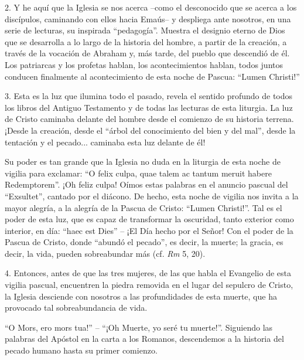 			\begin{body}2. Y he aquí que la Iglesia se nos acerca –como el desconocido que se acerca a los discípulos, caminando con ellos hacia Emaús– y despliega ante nosotros, en una serie de lecturas, su inspirada “pedagogía”. Muestra el designio eterno de Dios que se desarrolla a lo largo de la historia del hombre, a partir de la creación, a través de la vocación de Abraham y, más tarde, del pueblo que descendió de él. Los patriarcas y los profetas hablan, los acontecimientos hablan, todos juntos conducen finalmente al acontecimiento de esta noche de Pascua: “Lumen Christi!” \end{body}
			
			\begin{body}3. Esta es la luz que ilumina todo el pasado, revela el sentido profundo de todos los libros del Antiguo Testamento y de todas las lecturas de esta liturgia. La luz de Cristo caminaba delante del hombre desde el comienzo de su historia terrena. ¡Desde la creación, desde el “árbol del conocimiento del bien y del mal”, desde la tentación y el pecado... caminaba esta luz delante de él! \end{body}
			
			\begin{body}Su poder es tan grande que la Iglesia no duda en la liturgia de esta noche de vigilia para exclamar: “O felix culpa, quae talem ac tantum meruit habere Redemptorem”. ¡Oh feliz culpa! Oímos estas palabras en el anuncio pascual del “Exsultet”, cantado por el diácono. De hecho, esta noche de vigilia nos invita a la mayor alegría, a la alegría de la Pascua de Cristo: “Lumen Christi!”. Tal es el poder de esta luz, que es capaz de transformar la oscuridad, tanto exterior como interior, en día: “haec est Dies” – ¡El Día hecho por el Señor! Con el poder de la Pascua de Cristo, donde “abundó el pecado”, es decir, la muerte; la gracia, es decir, la vida, pueden sobreabundar más (cf. \textit{Rm }5, 20). \end{body}
			
			\begin{body}4. Entonces, antes de que las tres mujeres, de las que habla el Evangelio de esta vigilia pascual, encuentren la piedra removida en el lugar del sepulcro de Cristo, la Iglesia desciende con nosotros a las profundidades de esta muerte, que ha provocado tal sobreabundancia de vida. \end{body}
			
			\begin{body} “O Mors, ero mors tua!” – “¡Oh Muerte, yo seré tu muerte!”. Siguiendo las palabras del Apóstol en la carta a los Romanos, descendemos a la historia del pecado humano hasta su primer comienzo. \end{body}
			
